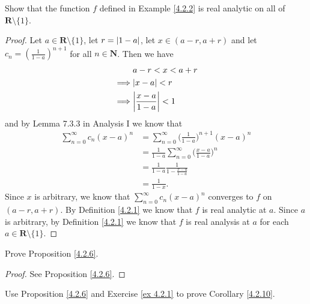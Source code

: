 \begin{exercise}\label{ex 4.2.2}
    Show that the function \(f\) defined in Example \ref{4.2.2} is real analytic on all of \(\mathbf{R} \setminus \{1\}\).
\end{exercise}

\begin{proof}
    Let \(a \in \mathbf{R} \setminus \{1\}\), let \(r = \abs*{1 - a}\), let \(x \in (a - r, a + r)\) and let \(c_n = (\frac{1}{1 - a})^{n + 1}\) for all \(n \in \mathbf{N}\).
    Then we have
    \begin{align*}
                 & a - r < x < a + r              \\
        \implies & \abs*{x - a} < r               \\
        \implies & \abs*{\frac{x - a}{1 - a}} < 1
    \end{align*}
    and by Lemma 7.3.3 in Analysis I we know that
    \begin{align*}
        \sum_{n = 0}^\infty c_n (x - a)^n & = \sum_{n = 0}^\infty \bigg(\frac{1}{1 - a}\bigg)^{n + 1} (x - a)^n     \\
                                          & = \frac{1}{1 - a} \sum_{n = 0}^\infty \bigg(\frac{x - a}{1 - a}\bigg)^n \\
                                          & = \frac{1}{1 - a} \frac{1}{1 - \frac{x - a}{1 - a}}                     \\
                                          & = \frac{1}{1 - x}.
    \end{align*}
    Since \(x\) is arbitrary, we know that \(\sum_{n = 0}^\infty c_n (x - a)^n\) converges to \(f\) on \((a - r, a + r)\).
    By Definition \ref{4.2.1} we know that \(f\) is real analytic at \(a\).
    Since \(a\) is arbitrary, by Definition \ref{4.2.1} we know that \(f\) is real analysis at \(a\) for each \(a \in \mathbf{R} \setminus \{1\}\).
\end{proof}

\begin{exercise}\label{ex 4.2.3}
    Prove Proposition \ref{4.2.6}.
\end{exercise}

\begin{proof}
    See Proposition \ref{4.2.6}.
\end{proof}

\begin{exercise}\label{ex 4.2.4}
    Use Proposition \ref{4.2.6} and Exercise \ref{ex 4.2.1} to prove Corollary \ref{4.2.10}.
\end{exercise}

